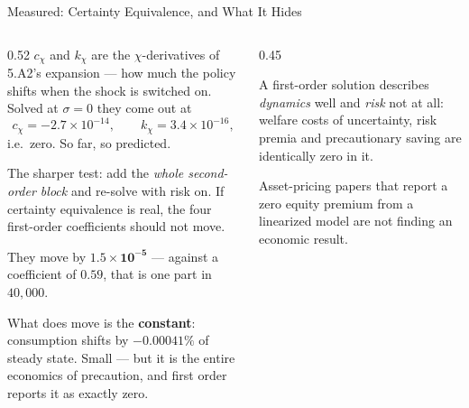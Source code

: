 \begin{frame}{Measured: Certainty Equivalence, and What It Hides}
\begin{columns}[T]
\begin{column}{0.52\textwidth}
\small
$c_\chi$ and $k_\chi$ are the $\chi$-derivatives of 5.A2's expansion --- how much the policy shifts
when the shock is switched on. Solved at $\sigma=0$ they come out at
\[
  c_\chi = -2.7\times10^{-14},\qquad k_\chi = 3.4\times10^{-16},
\]
i.e.\ zero. So far, so predicted.

The sharper test: add the \emph{whole second-order block} and re-solve with risk on. If certainty equivalence is real, the four first-order coefficients should not move.

They move by $\mathbf{1.5\times10^{-5}}$ --- against a coefficient of $0.59$, that is one part in
$40{,}000$.

What does move is the \textbf{constant}: consumption shifts by $-0.00041\%$ of steady state. Small --- but it is the entire economics of precaution, and first order reports it as exactly zero.
\end{column}
\begin{column}{0.45\textwidth}
\begin{conceptbox}[title=\textbf{In practice}]\small
A first-order solution describes \emph{dynamics} well and \emph{risk} not at all: welfare costs of uncertainty, risk premia and precautionary saving are identically zero in it.
\end{conceptbox}
\medskip
\begin{cautionbox}\footnotesize
Asset-pricing papers that report a zero equity premium from a linearized model are not finding an economic result.
\end{cautionbox}
\end{column}
\end{columns}
\vspace{1mm}
\end{frame}

